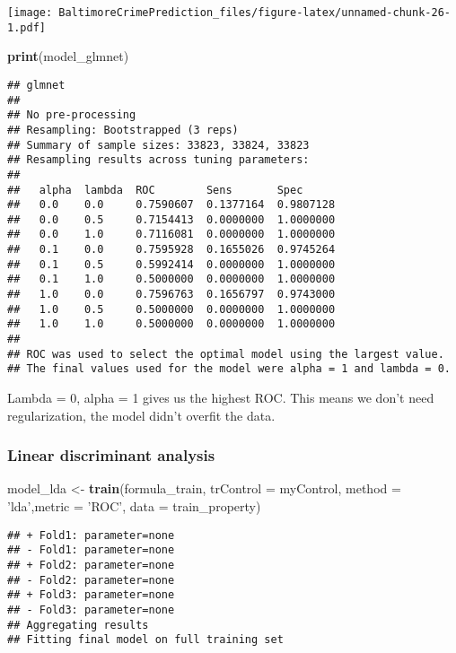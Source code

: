 \documentclass[]{article}
\newenvironment{Shaded}{\begin{snugshade}}{\end{snugshade}}
\newcommand{\KeywordTok}[1]{\textcolor[rgb]{0.13,0.29,0.53}{\textbf{#1}}}
\newcommand{\DataTypeTok}[1]{\textcolor[rgb]{0.13,0.29,0.53}{#1}}
\newcommand{\StringTok}[1]{\textcolor[rgb]{0.31,0.60,0.02}{#1}}
\newcommand{\NormalTok}[1]{#1}
\begin{document}
\texttt{[image: BaltimoreCrimePrediction\_files/figure-latex/unnamed-chunk-26-1.pdf]}

\begin{Shaded}
\begin{Highlighting}[]
\KeywordTok{print}\NormalTok{(model_glmnet)}
\end{Highlighting}
\end{Shaded}

\begin{verbatim}
## glmnet 
## 
## No pre-processing
## Resampling: Bootstrapped (3 reps) 
## Summary of sample sizes: 33823, 33824, 33823 
## Resampling results across tuning parameters:
## 
##   alpha  lambda  ROC        Sens       Spec     
##   0.0    0.0     0.7590607  0.1377164  0.9807128
##   0.0    0.5     0.7154413  0.0000000  1.0000000
##   0.0    1.0     0.7116081  0.0000000  1.0000000
##   0.1    0.0     0.7595928  0.1655026  0.9745264
##   0.1    0.5     0.5992414  0.0000000  1.0000000
##   0.1    1.0     0.5000000  0.0000000  1.0000000
##   1.0    0.0     0.7596763  0.1656797  0.9743000
##   1.0    0.5     0.5000000  0.0000000  1.0000000
##   1.0    1.0     0.5000000  0.0000000  1.0000000
## 
## ROC was used to select the optimal model using the largest value.
## The final values used for the model were alpha = 1 and lambda = 0.
\end{verbatim}

Lambda = 0, alpha = 1 gives us the highest ROC. This means we don't need
regularization, the model didn't overfit the data.

\subsubsection{Linear discriminant
analysis}\label{linear-discriminant-analysis}

\begin{Shaded}
\begin{Highlighting}[]
\NormalTok{model_lda <-}\StringTok{ }\KeywordTok{train}\NormalTok{(formula_train, }\DataTypeTok{trControl =}\NormalTok{ myControl, }
                      \DataTypeTok{method =} \StringTok{'lda'}\NormalTok{,}\DataTypeTok{metric =} \StringTok{'ROC'}\NormalTok{, }\DataTypeTok{data =}\NormalTok{ train_property)}
\end{Highlighting}
\end{Shaded}

\begin{verbatim}
## + Fold1: parameter=none 
## - Fold1: parameter=none 
## + Fold2: parameter=none 
## - Fold2: parameter=none 
## + Fold3: parameter=none 
## - Fold3: parameter=none 
## Aggregating results
## Fitting final model on full training set
\end{verbatim}
\end{document}
